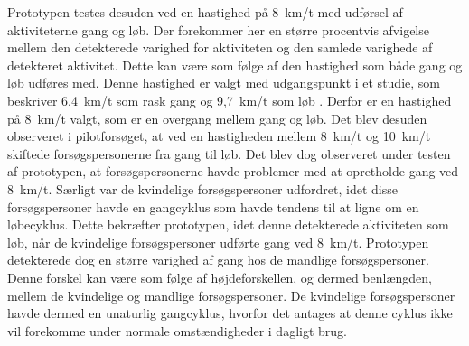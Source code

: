 Prototypen testes desuden ved en hastighed på 8~km/t med udførsel af aktiviteterne gang og løb. Der forekommer her en større procentvis afvigelse mellem den detekterede varighed for aktiviteten og den samlede varighede af detekteret aktivitet. Dette kan være som følge af den hastighed som både gang og løb udføres med. Denne hastighed er valgt med udgangspunkt i et studie, som beskriver 6,4~km/t som rask gang og 9,7~km/t som løb \citep{115}. Derfor er en hastighed på 8~km/t valgt, som er en overgang mellem gang og løb. Det blev desuden observeret i pilotforsøget, at ved en hastigheden mellem 8~km/t og 10~km/t skiftede forsøgspersonerne fra gang til løb. Det blev dog observeret under testen af prototypen, at forsøgspersonerne havde problemer med at opretholde gang ved 8~km/t. Særligt var de kvindelige forsøgspersoner udfordret, idet disse forsøgspersoner havde en gangcyklus som havde tendens til at ligne om en løbecyklus. Dette bekræfter prototypen, idet denne detekterede aktiviteten som løb, når de kvindelige forsøgspersoner udførte gang ved 8~km/t. Prototypen detekterede dog en større varighed af gang hos de mandlige forsøgspersoner. Denne forskel kan være som følge af højdeforskellen, og dermed benlængden, mellem de kvindelige og mandlige forsøgspersoner. De kvindelige forsøgspersoner havde dermed en unaturlig gangcyklus, hvorfor det antages at denne cyklus ikke vil forekomme under normale omstændigheder i dagligt brug.
